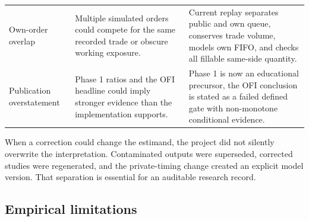 \begin{table}[H]
\begin{tabularx}{\textwidth}{@{}L{0.22\textwidth}YY@{}}
Own-order overlap & Multiple simulated orders could compete for the same recorded trade or obscure working exposure. & Current replay separates public and own queue, conserves trade volume, models own FIFO, and checks all fillable same-side quantity. \\
Publication overstatement & Phase 1 ratios and the OFI headline could imply stronger evidence than the implementation supports. & Phase 1 is now an educational precursor, the OFI conclusion is stated as a failed defined gate with non-monotone conditional evidence. \\
\bottomrule
\end{tabularx}
\end{table}

When a correction could change the estimand, the project did not silently
overwrite the interpretation. Contaminated outputs were superseded, corrected
studies were regenerated, and the private-timing change created an explicit
model version. That separation is essential for an auditable research record.

\subsection{Empirical limitations}

